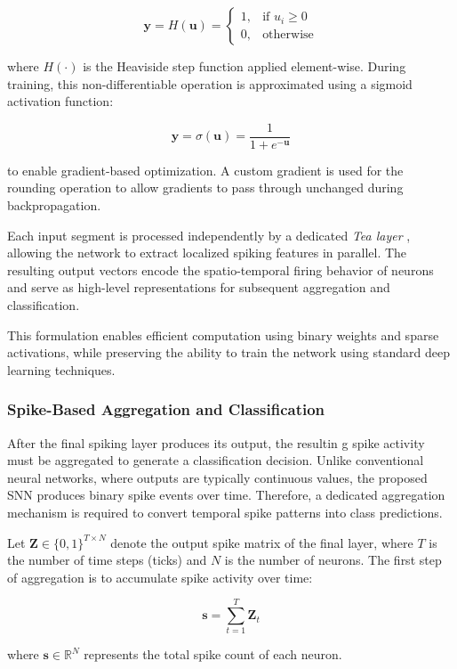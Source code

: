 \documentclass[../main.tex]{subfiles}
\begin{document}
\[
\mathbf{y} = H(\mathbf{u}) = 
\begin{cases}
1, & \text{if } u_i \geq 0 \\
0, & \text{otherwise}
\end{cases}
\]

where $H(\cdot)$ is the Heaviside step function applied element-wise. During training, this non-differentiable operation is approximated using a sigmoid activation function:

\[
\mathbf{y} = \sigma(\mathbf{u}) = \frac{1}{1 + e^{-\mathbf{u}}}
\]

to enable gradient-based optimization. A custom gradient is used for the rounding operation to allow gradients to pass through unchanged during backpropagation.

Each input segment is processed independently by a dedicated \textit{Tea layer} \cite{RANC}, allowing the network to extract localized spiking features in parallel. The resulting output vectors encode the spatio-temporal firing behavior of neurons and serve as high-level representations for subsequent aggregation and classification.

This formulation enables efficient computation using binary weights and sparse activations, while preserving the ability to train the network using standard deep learning techniques.

\subsubsection{Spike-Based Aggregation and Classification}

After the final spiking layer produces its output, the resultin
g spike activity must be aggregated to generate a classification decision. Unlike conventional neural networks, where outputs are typically continuous values, the proposed SNN produces binary spike events over time. Therefore, a dedicated aggregation mechanism is required to convert temporal spike patterns into class predictions.

Let $\mathbf{Z} \in \{0,1\}^{T \times N}$ denote the output spike matrix of the final layer, where $T$ is the number of time steps (ticks) and $N$ is the number of neurons. The first step of aggregation is to accumulate spike activity over time:

\[
\mathbf{s} = \sum_{t=1}^{T} \mathbf{Z}_t
\]

where $\mathbf{s} \in \mathbb{R}^{N}$ represents the total spike count of each neuron.
\end{document}
